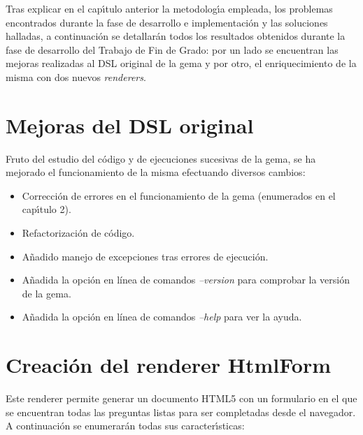 


Tras explicar en el cap\'{\i}tulo anterior la metodolog\'{\i}a empleada, los problemas encontrados
durante la fase de desarrollo e implementaci\'on y las soluciones halladas, a continuaci\'on se
detallar\'an todos los resultados obtenidos durante la fase de desarrollo del Trabajo de Fin de Grado: 
por un lado se encuentran las mejoras realizadas al DSL original de la gema y por otro, el enriquecimiento
de la misma con dos nuevos \textit{renderers}.

\section{Mejoras del DSL original}
\label{3:sec1}

Fruto del estudio del c\'odigo y de ejecuciones sucesivas de la gema, se ha mejorado el funcionamiento
de la misma efectuando diversos cambios:

\begin{itemize}
  \item Correcci\'on de errores en el funcionamiento de la gema (enumerados en el cap\'{\i}tulo 2).
  \item Refactorizaci\'on de c\'odigo.
  \item A\~{n}adido manejo de excepciones tras errores de ejecuci\'on.
  \item A\~{n}adida la opci\'on en l\'inea de comandos \textit{--version} para comprobar la versi\'on de la gema. 
  \item A\~{n}adida la opci\'on en l\'inea de comandos \textit{--help} para ver la ayuda. 
\end{itemize}

\section{Creaci\'on del renderer HtmlForm}
\label{3:sec2}

Este renderer permite generar un documento HTML5 con un formulario en el que se encuentran todas las
preguntas listas para ser completadas desde el navegador. A continuaci\'on se enumerar\'an todas sus 
caracter\'{\i}sticas:

